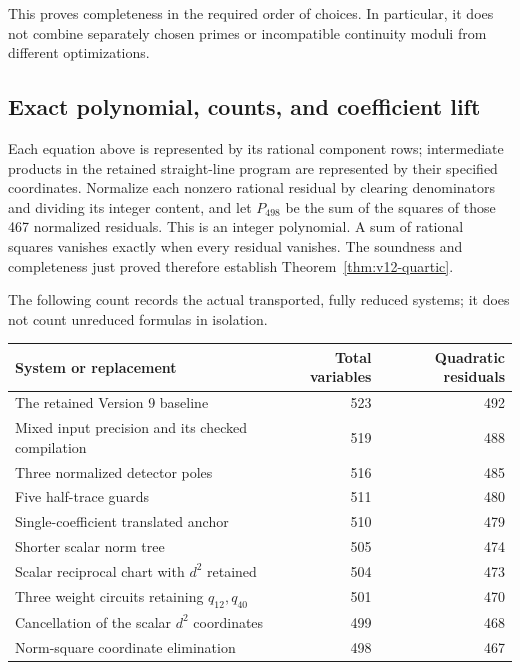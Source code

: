 This proves completeness in the required order of choices.  In
particular, it does not combine separately chosen primes or
incompatible continuity moduli from different optimizations.

\subsection{Exact polynomial, counts, and coefficient lift}
\label{subsec:v12-finite}

Each equation above is represented by its rational component rows;
intermediate products in the retained straight-line program are
represented by their specified coordinates.  Normalize each nonzero
rational residual by clearing denominators and dividing its integer
content, and let $P_{498}$ be the sum of the squares of those 467
normalized residuals.  This is an integer polynomial.  A sum of
rational squares vanishes exactly when every residual vanishes.
The soundness and completeness just proved therefore establish
Theorem~\ref{thm:v12-quartic}.

The following count records the actual transported, fully reduced
systems; it does not count unreduced formulas in isolation.
\begin{center}\small
\begin{tabular}{lrr}
\toprule
System or replacement & Total variables & Quadratic residuals\\
\midrule
The retained Version 9 baseline &523&492\\
Mixed input precision and its checked compilation &519&488\\
Three normalized detector poles &516&485\\
Five half-trace guards &511&480\\
Single-coefficient translated anchor &510&479\\
Shorter scalar norm tree &505&474\\
Scalar reciprocal chart with $d^2$ retained &504&473\\
Three weight circuits retaining $q_{12},q_{40}$ &501&470\\
Cancellation of the scalar $d^2$ coordinates &499&468\\
Norm-square coordinate elimination &498&467\\
\bottomrule
\end{tabular}
\end{center}

